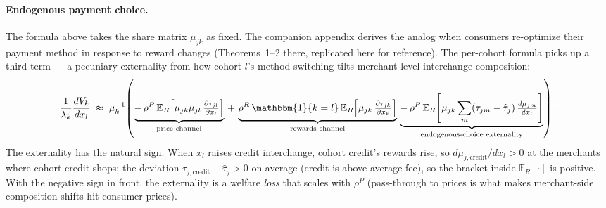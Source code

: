 \documentclass[11pt]{article}
\begin{document}
\paragraph{Endogenous payment choice.}
The formula above takes the share matrix $\mu_{jk}$ as fixed.
The companion appendix derives the analog when consumers re-optimize their payment method in response to reward changes (Theorems~1--2 there, replicated here for reference).
The per-cohort formula picks up a third term --- a pecuniary externality from how cohort $l$'s method-switching tilts merchant-level interchange composition:
\begin{equation}
\frac{1}{\lambda_k}\frac{dV_k}{dx_l}
\;\approx\;
\mu_k^{-1}\!\left(
\underbrace{-\,\rho^{P}\,\mathbb{E}_R\!\left[\mu_{jk}\mu_{jl}\,\tfrac{\partial\tau_{jl}}{\partial x_l}\right]}_{\text{price channel}}
\,+\,
\underbrace{\rho^{R}\,\mathbbm{1}\{k=l\}\,\mathbb{E}_R\!\left[\mu_{jk}\,\tfrac{\partial\tau_{jk}}{\partial x_k}\right]}_{\text{rewards channel}}
\,\underbrace{-\,\rho^{P}\,\mathbb{E}_R\!\left[\mu_{jk}\sum_m(\tau_{jm}-\hat\tau_j)\,\tfrac{d\mu_{jm}}{dx_l}\right]}_{\text{endogenous-choice externality}}
\right).
\label{eq:per-cohort-endo}
\end{equation}
The externality has the natural sign.
When $x_l$ raises credit interchange, cohort credit's rewards rise, so $d\mu_{j,\text{credit}}/dx_l > 0$ at the merchants where cohort credit shops; the deviation $\tau_{j,\text{credit}}-\hat\tau_j > 0$ on average (credit is above-average fee), so the bracket inside $\mathbb{E}_R[\cdot]$ is positive.
With the negative sign in front, the externality is a welfare \emph{loss} that scales with $\rho^P$ (pass-through to prices is what makes merchant-side composition shifts hit consumer prices).
\end{document}
